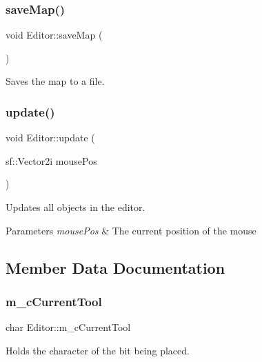\subsubsection{\texorpdfstring{save\+Map()}{saveMap()}}
{\footnotesize\ttfamily void Editor\+::save\+Map (\begin{DoxyParamCaption}{ }\end{DoxyParamCaption})}



Saves the map to a file. 

\mbox{\label{class_editor_aa2bc683d68f5df26779d90322b7b52b4}} 
\subsubsection{\texorpdfstring{update()}{update()}}
{\footnotesize\ttfamily void Editor\+::update (\begin{DoxyParamCaption}\item[{sf\+::\+Vector2i}]{mouse\+Pos }\end{DoxyParamCaption})}



Updates all objects in the editor. 


\begin{DoxyParams}{Parameters}
{\em mouse\+Pos} & The current position of the mouse \\
\hline
\end{DoxyParams}


\subsection{Member Data Documentation}
\mbox{\label{class_editor_a1aa49f79c1ba5965a2cad825480fb7bd}} 
\subsubsection{\texorpdfstring{m\+\_\+c\+Current\+Tool}{m\_cCurrentTool}}
{\footnotesize\ttfamily char Editor\+::m\+\_\+c\+Current\+Tool\hspace{0.3cm}{\ttfamily [private]}}



Holds the character of the bit being placed. 

